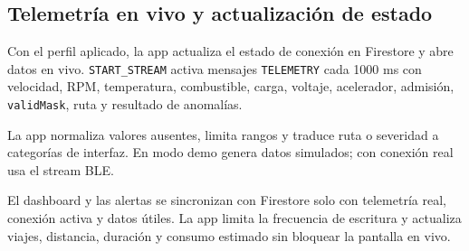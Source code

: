 \documentclass[12pt,letterpaper]{report}
\begin{document}
\subsection{Telemetría en vivo y actualización de estado}

Con el perfil aplicado, la app actualiza el estado de conexión en Firestore y abre datos en vivo. \texttt{START\_STREAM} activa mensajes \texttt{TELEMETRY} cada 1000 ms con velocidad, RPM, temperatura, combustible, carga, voltaje, acelerador, admisión, \texttt{validMask}, ruta y resultado de anomalías.

La app normaliza valores ausentes, limita rangos y traduce ruta o severidad a categorías de interfaz. En modo demo genera datos simulados; con conexión real usa el stream BLE.

El dashboard y las alertas se sincronizan con Firestore solo con telemetría real, conexión activa y datos útiles. La app limita la frecuencia de escritura y actualiza viajes, distancia, duración y consumo estimado sin bloquear la pantalla en vivo.
\end{document}
